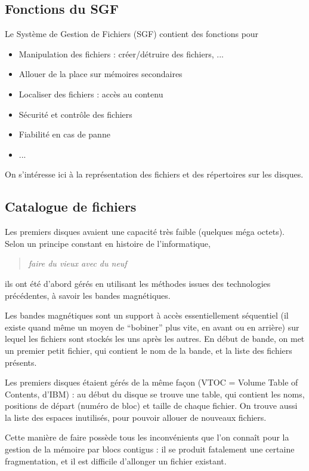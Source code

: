 \begin{multicols}{2}
\subsection{Fonctions du SGF}

Le Système de Gestion de Fichiers (SGF) contient des fonctions pour

\begin{itemize}
\item Manipulation des fichiers : créer/détruire des fichiers, ...
\item  Allouer de la place sur mémoires secondaires
\item Localiser des fichiers : accès au contenu
\item Sécurité et contrôle des fichiers
\item Fiabilité en cas de panne
\item ...
\end{itemize}

On s'intéresse ici à la représentation des fichiers et des répertoires sur les
disques.

\subsection{Catalogue de fichiers}

Les premiers disques avaient une capacité très faible (quelques méga octets).
Selon un principe constant en histoire de l'informatique,
\begin{quotation}
\emph{faire du vieux avec du neuf}
\end{quotation}
 ils ont été
d'abord gérés en utilisant les méthodes issues des technologies précédentes,
à savoir les bandes magnétiques.

Les bandes magnétiques sont un support à accès essentiellement
séquentiel (il existe quand même un moyen de ``bobiner'' plus vite, en
avant ou en arrière) sur lequel les fichiers sont stockés les uns
après les autres. En début de bande, on met un premier petit fichier, qui 
contient le nom de la bande, et la liste des fichiers présents.

Les premiers disques étaient gérés de la même façon (VTOC = Volume
Table of Contents, d'IBM) : au début du disque se trouve une table,
qui contient les noms, positions de départ (numéro de bloc) et taille
de chaque fichier.  On trouve aussi la liste des espaces inutilisés,
pour pouvoir allouer de nouveaux fichiers.


Cette manière de faire possède tous les inconvénients que l'on connaît
pour la gestion de la mémoire par blocs contigus : il se produit fatalement
une certaine fragmentation, et il est difficile d'allonger un fichier existant.


\end{multicols}
